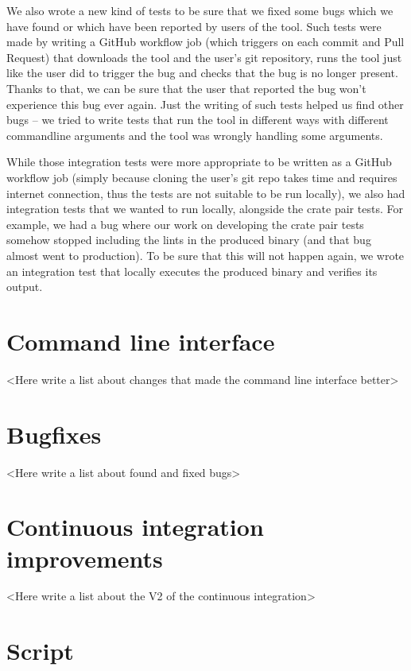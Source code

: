 \documentclass[licencjacka,en]{pracamgr}
\begin{document}
We also wrote a new kind of tests to be sure that we fixed some bugs
which we have found or which have been reported by users of the tool.
Such tests were made by writing a GitHub workflow job (which triggers on each
commit and Pull Request) that downloads the tool and the user's git repository,
runs the tool just like the user did to trigger the bug
and checks that the bug is no longer present.
Thanks to that, we can be sure that the user that reported the bug
won't experience this bug ever again.
Just the writing of such tests helped us find other bugs
-- we tried to write tests that run the tool in different ways
with different commandline arguments and the tool was wrongly handling some arguments.

While those integration tests were more appropriate to be written as a GitHub workflow job
(simply because cloning the user's git repo takes time and requires internet connection,
thus the tests are not suitable to be run locally),
we also had integration tests that we wanted to run locally, alongside the crate pair tests.
For example, we had a bug where our work on developing the crate pair tests somehow
stopped including the lints in the produced binary (and that bug almost went to production).
To be sure that this will not happen again, we wrote an integration test that
locally executes the produced binary and verifies its output.

\section{Command line interface}\label{r:section_cli}

<Here write a list about changes that made the command line interface better>

\section{Bugfixes}\label{r:section_bugfixes}

<Here write a list about found and fixed bugs>

\section{Continuous integration improvements}\label{r:section_continuous_integration_improvements}

<Here write a list about the V2 of the continuous integration>

\section{Script}\label{r:section_script_implementation}
\end{document}
